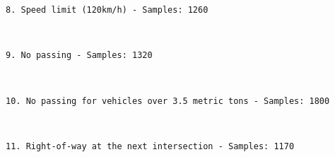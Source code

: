 \documentclass[11pt]{article}
\begin{document}
    \begin{Verbatim}[commandchars=\\\{\}]
8. Speed limit (120km/h) - Samples: 1260

    \end{Verbatim}

    \begin{center}
    \end{center}
    { \hspace*{\fill} \\}
    
    \begin{Verbatim}[commandchars=\\\{\}]
9. No passing - Samples: 1320

    \end{Verbatim}

    \begin{center}
    \end{center}
    { \hspace*{\fill} \\}
    
    \begin{Verbatim}[commandchars=\\\{\}]
10. No passing for vehicles over 3.5 metric tons - Samples: 1800

    \end{Verbatim}

    \begin{center}
    \end{center}
    { \hspace*{\fill} \\}
    
    \begin{Verbatim}[commandchars=\\\{\}]
11. Right-of-way at the next intersection - Samples: 1170

    \end{Verbatim}

    \begin{center}
    \end{center}
    { \hspace*{\fill} \\}
    
\end{document}
